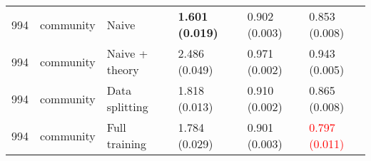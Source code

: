 \begin{tabular}[t]{rlllll}
\hspace{1em}994 & community & Naive & \textbf{1.601 (0.019)} & 0.902 (0.003) & 0.853 (0.008)\\
\hspace{1em}994 & community & Naive + theory & 2.486 (0.049) & 0.971 (0.002) & 0.943 (0.005)\\
\hspace{1em}994 & community & Data splitting & 1.818 (0.013) & 0.910 (0.002) & 0.865 (0.008)\\
\hspace{1em}994 & community & Full training & 1.784 (0.029) & 0.901 (0.003) & \textcolor{red}{0.797 (0.011)}\\
\bottomrule
\end{tabular}

